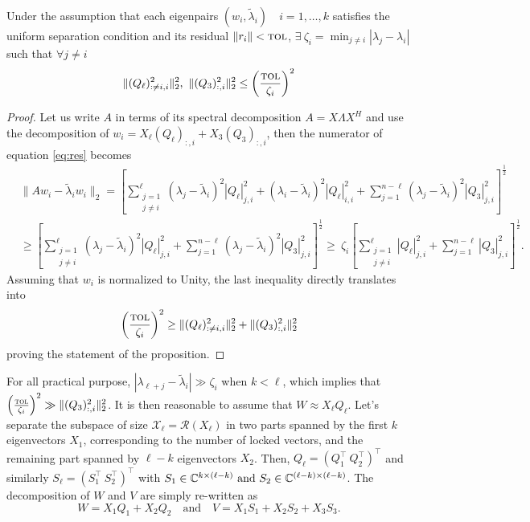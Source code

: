 \begin{proposition}
Under the assumption that each eigenpairs $(w_i, \tilde{\lambda}_i)\quad i=1, \dots ,k$ satisfies the uniform separation condition and its residual $\|r_i\| < \textsc{tol}$, 
$\exists\ \zeta_i = \min_{j\neq i} |\lambda_j - \lambda_i|$ such that $\forall j \neq i$
\[
\|(Q_\ell)^2_{:\neq i,i}\|^2_2 ,\ \|(Q_3)^2_{:,i}\|^2_2 \leq \left(\frac{\textsc{tol}}{\zeta_i}\right)^2 
\]
\end{proposition}
\begin{proof}
  Let us write $A$ in terms of its spectral decomposition $A=X\Lambda X^H$ and use the decomposition of $w_i = X_\ell (Q_\ell)_{:,i} + X_3 (Q_3)_{:,i}$, then the numerator of equation \eqref{eq:res} becomes
  \begin{eqnarray*}
  & \|Aw_i - \tilde{\lambda}_i w_i\|_2 =  \left[ \sum_{\substack{j=1\\j\neq i}}^\ell (\lambda_j - \tilde{\lambda}_i)^2 |Q_\ell|^2_{j,i} + (\lambda_i - \tilde{\lambda}_i)^2 |Q_\ell|^2_{i,i} + \sum_{j=1}^{n-\ell} (\lambda_j - \tilde{\lambda}_i)^2 |Q_3|^2_{j,i} \right]^{\frac{1}{2}} \\
  & \geq  \left[ \sum_{\substack{j=1\\j\neq i}}^\ell (\lambda_j - \tilde{\lambda}_i)^2 |Q_\ell|^2_{j,i} + \sum_{j=1}^{n-\ell} (\lambda_j - \tilde{\lambda}_i)^2 |Q_3|^2_{j,i} \right]^{\frac{1}{2}}
  \geq\ \zeta_i \left[ \sum_{\substack{j=1\\j\neq i}}^\ell |Q_\ell|^2_{j,i} + \sum_{j=1}^{n-\ell} |Q_3|^2_{j,i} \right]^{\frac{1}{2}}.
  \end{eqnarray*}
 Assuming that $w_i$ is normalized to Unity, the last inequality directly translates into
 \[
 \left(\frac{\textsc{tol}}{\zeta_i}\right)^2 \geq  \|(Q_\ell)^2_{:\neq i,i}\|_2^2 +  \|(Q_3)^2_{:,i}\|^2_2
 \]
 proving the statement of the proposition.
\end{proof}

For all practical purpose, $|\lambda_{\ell+j} - \tilde{\lambda}_i | \gg \zeta_i $ when $k < \ell$, which implies that $\left(\frac{\textsc{tol}}{\zeta_i}\right)^2 \gg \|(Q_3)^2_{:,i}\|^2_2$. It is then reasonable to assume that $W \approx X_\ell Q_\ell$. 
Let's separate the subspace of size $\mathcal{X}_\ell = \mathcal{R}(X_\ell)$ in two parts spanned by the first $k$ eigenvectors $X_1$, corresponding to the number of locked vectors, and the remaining part spanned by $\ell-k$ eigenvectors $X_2$. Then, $Q_\ell = (Q_1^\top \ Q_2^\top)^\top$ and similarly $S_\ell = (S_1^\top \ S_2^\top)^\top$ with $S_1 \in \C^{k\times (\ell -k)}\ \textrm{and}\ S_2 \in \C^{(\ell-k)\times (\ell-k)}$. The decomposition of $W$ and $V$ are simply re-written as
\[
W = X_1 Q_1 + X_2 Q_2 \quad \textrm{and} \quad V = X_1 S_1 + X_2 S_2 + X_3 S_3.
\]

